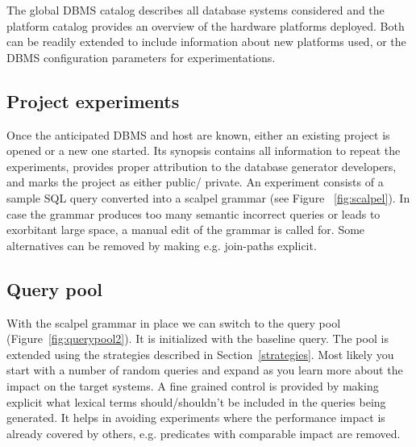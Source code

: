 \documentclass{cidr-2019}
\begin{document}

The global DBMS catalog describes all database systems considered
and the platform catalog provides an overview of the hardware platforms deployed.
Both can be readily extended to include information about new platforms used,
or the DBMS configuration parameters for experimentations.

\subsection{Project experiments}
Once the anticipated DBMS and host are known, either an existing project is opened or a new one started. 
Its synopsis contains all information to repeat the experiments, provides
proper attribution to the database generator developers, and marks the project as either public/ private.
An experiment consists of a sample SQL query converted into
a scalpel grammar (see Figure ~\ref{fig:scalpel}). In case the grammar produces
too many semantic incorrect queries or leads to exorbitant large space, 
a manual edit of the grammar is called for. Some alternatives can be removed 
by making e.g. join-paths explicit. 

\subsection{Query pool}
With the scalpel grammar in place we can switch to the query pool (Figure~\ref{fig:querypool2}). It is initialized with the baseline query. 
The pool is extended using the strategies described in Section~\ref{strategies}.
Most likely you start with a number of random queries and expand as you learn more about the impact on the target systems. A fine grained control is provided by making explicit what
lexical terms should/shouldn't be included in the queries being generated. It helps in avoiding experiments where the performance impact is already covered by others, e.g. predicates with comparable impact are removed.
\end{document}
